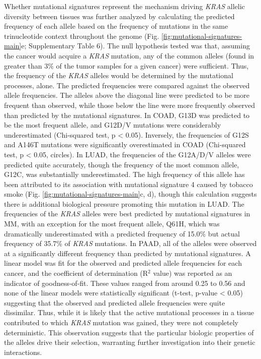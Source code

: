 \documentclass[english, 10pt, letterpaper]{article}
\newcommand{\KRAS}{\emph{KRAS}}
\begin{document}
Whether mutational signatures represent the mechanism driving \KRAS{} allelic diversity between tissues was further analyzed by calculating the predicted frequency of each allele based on the frequency of mutations in the same trinucleotide context throughout the genome (Fig. \ref{fig:mutational-signatures-main}e; Supplementary Table 6).
The null hypothesis tested was that, assuming the cancer would acquire a \KRAS{} mutation, any of the common alleles (found in greater than 3\% of the tumor samples for a given cancer) were sufficient.
Thus, the frequency of the \KRAS{} alleles would be determined by the mutational processes, alone.
The predicted frequencies were compared against the observed allele frequencies.
The alleles above the diagonal line were predicted to be more frequent than observed, while those below the line were more frequently observed than predicted by the mutational signatures.
In COAD, G13D was predicted to be the most frequent allele, and G12D/V mutations were considerably underestimated (Chi-squared test, p < 0.05).
Inversely, the frequencies of G12S and A146T mutations were significantly overestimated in COAD (Chi-squared test, p < 0.05, circles).
In LUAD, the frequencies of the G12A/D/V alleles were predicted quite accurately, though the frequency of the most common allele, G12C, was substantially underestimated.
The high frequency of this allele has been attributed to its association with mutational signature 4 caused by tobacco smoke (Fig. \ref{fig:mutational-signatures-main}c, d), though this calculation suggests there is additional biological pressure promoting this mutation in LUAD.
The frequencies of the \KRAS{} alleles were best predicted by mutational signatures in MM, with an exception for the most frequent allele, Q61H, which was dramatically underestimated with a predicted frequency of 15.0\% but actual frequency of 35.7\% of \KRAS{} mutations.
In PAAD, all of the alleles were observed at a significantly different frequency than predicted by mutational signatures.
A linear model was fit for the observed and predicted allele frequencies for each cancer, and the coefficient of determination (R$^2$ value) was reported as an indicator of goodness-of-fit.
These values ranged from around 0.25 to 0.56 and none of the linear models were statistically significant (t-test, p-value < 0.05) suggesting that the observed and predicted allele frequencies were quite dissimilar.
Thus, while it is likely that the active mutational processes in a tissue contributed to which \KRAS{} mutation was gained, they were not completely deterministic.
This observation suggests that the particular biologic properties of the alleles drive their selection, warranting further investigation into their genetic interactions.
\end{document}
